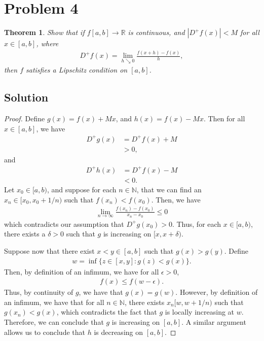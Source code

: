 \documentclass[10pt,a4paper]{article}
\theoremstyle{theorem}
\newtheorem{theorem}{Theorem}
\theoremstyle{definition}
\begin{document}
\section*{Problem 4}
\begin{theorem}
Show that if $f[a, b] \to \mathbb{R}$ is continuous, and $|D^+ f(x)| < M$ for all $x \in [a, b]$, where
\begin{align*}
D^+ f(x) = \lim_{h \searrow 0} \frac{f(x + h) - f(x)}{h},
\end{align*}
then $f$ satisfies a Lipschitz condition on $[a, b]$.
\end{theorem}

\subsection*{Solution}
\begin{proof}
Define $g(x) = f(x) + Mx$, and $h(x) = f(x) - Mx$. Then for all $x \in [a, b]$, we have
\begin{align*}
D^+ g(x) &= D^+ f(x) + M\\
&> 0,
\end{align*}
and
\begin{align*}
D^+ h(x) &= D^+ f(x) - M\\
&< 0.
\end{align*}
Let $x_0 \in [a, b)$, and suppose for each $n \in \mathbb{N}$, that we can find an $x_n \in [x_0, x_0 + 1/n)$ such that $f(x_n) < f(x_0)$. Then, we have
\begin{align*}
\lim_{n \to \infty} \frac{f(x_n) - f(x_0)}{x_n - x_0} \leq 0
\end{align*}
which contradicts our assumption that $D^+ g(x_0) > 0$. Thus, for each $x \in [a, b)$, there exists a $\delta > 0$ such that $g$ is increasing on $[x, x + \delta)$.

Suppose now that there exist $x < y \in [a, b]$ such that $g(x) > g(y)$. Define
\begin{align*}
w = \inf \{z \in [x, y]: g(z) < g(x) \}.
\end{align*}
Then, by definition of an infimum, we have for all $\epsilon > 0$, 
\begin{align*}
f(x) \leq f(w - \epsilon).
\end{align*}
Thus, by continuity of $g$, we have that $g(x) = g(w)$. However, by definition of an infimum, we have that for all $n \in \mathbb{N}$, there exists $x_n [w, w + 1/n)$ such that $g(x_n) < g(x)$, which contradicts the fact that $g$ is locally increasing at $w$. Therefore, we can conclude that $g$ is increasing on $[a, b]$. A similar argument allows us to conclude that $h$ is decreasing on $[a, b]$.


\end{proof}
\end{document}
